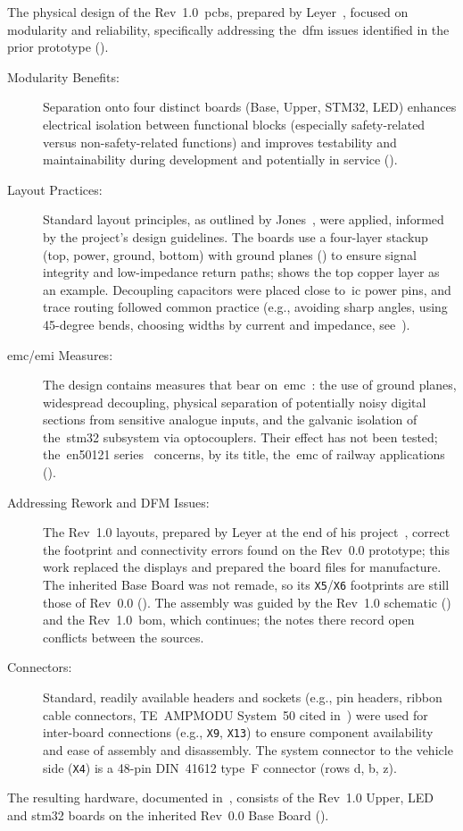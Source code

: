 The physical design of the Rev~1.0~\glspl{pcb}, prepared by Leyer~\cite{leyer2023}, focused on modularity and reliability, specifically addressing the~\gls{dfm} issues identified in the prior prototype ().

\begin{description}
	\item[Modularity Benefits:] Separation onto four distinct boards (Base, Upper, STM32, LED) enhances electrical isolation between functional blocks (especially safety-related versus non-safety-related functions) and improves testability and maintainability during development and potentially in service ().
	\item[Layout Practices:] Standard layout principles, as outlined by Jones~\cite{jones2004}, were applied, informed by the project's design guidelines. The boards use a four-layer stackup (top, power, ground, bottom) with ground planes () to ensure signal integrity and low-impedance return paths;  shows the top copper layer as an example. Decoupling capacitors were placed close to~\gls{ic} power pins, and trace routing followed common practice (e.g., avoiding sharp angles, using 45-degree bends, choosing widths by current and impedance, see~\cite[pp.~7, 10, 12]{jones2004}).
	\item[\gls{emc}/\gls{emi} Measures:] The design contains measures that bear on~\gls{emc}~\cite{ott2009emc}: the use of ground planes, widespread decoupling, physical separation of potentially noisy digital sections from sensitive analogue inputs, and the galvanic isolation of the~\gls{stm32} subsystem via optocouplers. Their effect has not been tested; the~\gls{en50121} series~\cite{en50121_3_2_2016} concerns, by its title, the~\gls{emc} of railway applications ().
	\item[Addressing Rework and DFM Issues:] The Rev~1.0 layouts, prepared by Leyer at the end of his project~\cite[Sec.~9.2]{leyer2023}, correct the footprint and connectivity errors found on the Rev~0.0 prototype; this work replaced the displays and prepared the board files for manufacture. The inherited Base Board was not remade, so its \texttt{X5}/\texttt{X6} footprints are still those of Rev~0.0 (). The assembly was guided by the Rev~1.0 schematic () and the Rev~1.0~\gls{bom}, which  continues; the notes there record open conflicts between the sources.
	\item[Connectors:] Standard, readily available headers and sockets (e.g., pin headers, ribbon cable connectors, TE~AMPMODU System~50 cited in~) were used for inter-board connections (e.g., \texttt{X9}, \texttt{X13}) to ensure component availability and ease of assembly and disassembly. The system connector to the vehicle side (\texttt{X4}) is a 48-pin DIN~41612 type~F connector (rows d, b, z).
\end{description}
The resulting hardware, documented in~, consists of the Rev~1.0 Upper, LED and \gls{stm32} boards on the inherited Rev~0.0 Base Board ().

